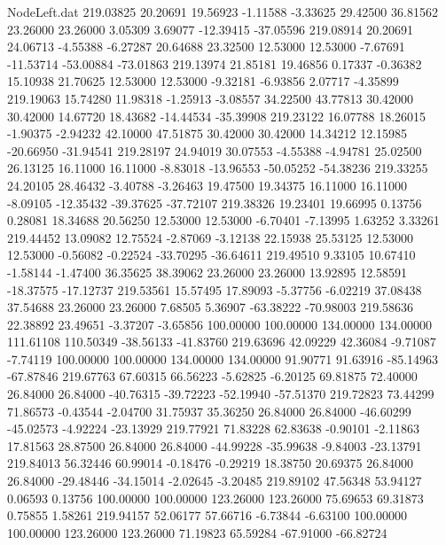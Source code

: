\begin{filecontents}{NodeLeft.dat}
 219.03825   20.20691   19.56923    -1.11588   -3.33625   29.42500   36.81562   23.26000   23.26000    3.05309    3.69077  -12.39415  -37.05596
 219.08914   20.20691   24.06713    -4.55388   -6.27287   20.64688   23.32500   12.53000   12.53000   -7.67691  -11.53714  -53.00884  -73.01863
 219.13974   21.85181   19.46856     0.17337   -0.36382   15.10938   21.70625   12.53000   12.53000   -9.32181   -6.93856    2.07717   -4.35899
 219.19063   15.74280   11.98318    -1.25913   -3.08557   34.22500   43.77813   30.42000   30.42000   14.67720   18.43682  -14.44534  -35.39908
 219.23122   16.07788   18.26015    -1.90375   -2.94232   42.10000   47.51875   30.42000   30.42000   14.34212   12.15985  -20.66950  -31.94541
 219.28197   24.94019   30.07553    -4.55388   -4.94781   25.02500   26.13125   16.11000   16.11000   -8.83018  -13.96553  -50.05252  -54.38236
 219.33255   24.20105   28.46432    -3.40788   -3.26463   19.47500   19.34375   16.11000   16.11000   -8.09105  -12.35432  -39.37625  -37.72107
 219.38326   19.23401   19.66995     0.13756    0.28081   18.34688   20.56250   12.53000   12.53000   -6.70401   -7.13995    1.63252    3.33261
 219.44452   13.09082   12.75524    -2.87069   -3.12138   22.15938   25.53125   12.53000   12.53000   -0.56082   -0.22524  -33.70295  -36.64611
 219.49510    9.33105   10.67410    -1.58144   -1.47400   36.35625   38.39062   23.26000   23.26000   13.92895   12.58591  -18.37575  -17.12737
 219.53561   15.57495   17.89093    -5.37756   -6.02219   37.08438   37.54688   23.26000   23.26000    7.68505    5.36907  -63.38222  -70.98003
 219.58636   22.38892   23.49651    -3.37207   -3.65856  100.00000  100.00000  134.00000  134.00000  111.61108  110.50349  -38.56133  -41.83760
 219.63696   42.09229   42.36084    -9.71087   -7.74119  100.00000  100.00000  134.00000  134.00000   91.90771   91.63916  -85.14963  -67.87846
 219.67763   67.60315   66.56223    -5.62825   -6.20125   69.81875   72.40000   26.84000   26.84000  -40.76315  -39.72223  -52.19940  -57.51370
 219.72823   73.44299   71.86573    -0.43544   -2.04700   31.75937   35.36250   26.84000   26.84000  -46.60299  -45.02573   -4.92224  -23.13929
 219.77921   71.83228   62.83638    -0.90101   -2.11863   17.81563   28.87500   26.84000   26.84000  -44.99228  -35.99638   -9.84003  -23.13791
 219.84013   56.32446   60.99014    -0.18476   -0.29219   18.38750   20.69375   26.84000   26.84000  -29.48446  -34.15014   -2.02645   -3.20485
 219.89102   47.56348   53.94127     0.06593    0.13756  100.00000  100.00000  123.26000  123.26000   75.69653   69.31873    0.75855    1.58261
 219.94157   52.06177   57.66716    -6.73844   -6.63100  100.00000  100.00000  123.26000  123.26000   71.19823   65.59284  -67.91000  -66.82724

\end{filecontents}
